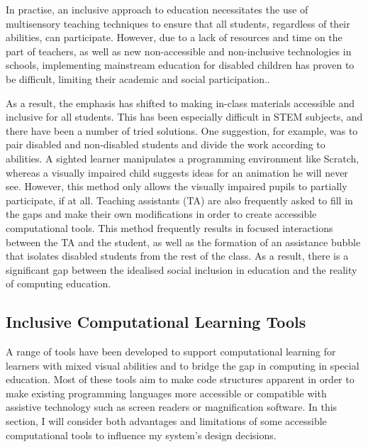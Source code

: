 \documentclass[oneside,%
                    author={Malak Hajji},
                    degree={BSc},
                    title={Designing An Accessible Computational Toolkit For Students},
                  subtitle={With Mixed Visual Abilities}]{dissertation}
\begin{document}
In practise, an inclusive approach to education necessitates the use of multisensory teaching techniques to ensure that all students, regardless of their abilities, can participate. However, due to a lack of resources and time on the part of teachers, as well as new non-accessible and non-inclusive technologies in schools, implementing mainstream education for disabled children has proven to be difficult, limiting their academic and social participation.\cite{gray}. 

As a result, the emphasis has shifted to making in-class materials accessible and inclusive for all students. This has been especially difficult in STEM subjects\cite{moon}, and there have been a number of tried solutions. One suggestion, for example, was to pair disabled and non-disabled students and divide the work according to abilities. A sighted learner manipulates a programming environment like Scratch, whereas a visually impaired child suggests ideas for an animation he will never see. However, this method only allows the visually impaired pupils to partially participate, if at all. Teaching assistants (TA) are also frequently asked to fill in the gaps and make their own modifications in order to create accessible computational tools. This method frequently results in focused interactions between the TA and the student, as well as the formation of an assistance bubble that isolates disabled students from the rest of the class\cite{metatla}. As a result, there is a significant gap between the idealised social inclusion in education and the reality of computing education.

\subsection{Inclusive Computational Learning Tools}

A range of tools have been developed to support computational learning for learners with mixed visual abilities and to bridge the gap in computing in special education. Most of these tools aim to make code structures apparent in order to make existing programming languages more accessible or compatible with assistive technology such as screen readers or magnification software. In this section, I will consider both advantages and limitations of some accessible computational tools to influence my system’s design decisions. 
\end{document}
